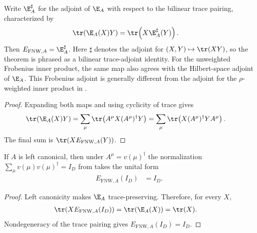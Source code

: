 \begin{lemma}
    \label{thm:fnw_transfer_map_trace_adjoint}
    \leanok
    Write $\E_A^\sharp$ for the adjoint of $\E_A$ with respect to the
    bilinear trace pairing, characterized by
    \begin{align}
        \tr\!\left(\E_A(X)Y\right)
         & =\tr\!\left(X\E_A^\sharp(Y)\right).
        \label{eq:fnw_transfer_map_trace_adjoint}
    \end{align}
    Then $E_{\mathrm{FNW},A}=\E_A^\sharp$. Here $\sharp$ denotes the adjoint
    for $(X,Y)\mapsto\tr(XY)$, so the theorem is phrased as a bilinear
    trace-adjoint identity. For the unweighted Frobenius inner product, the
    same map also agrees with the Hilbert-space adjoint of $\E_A$. This
    Frobenius adjoint is generally different from the adjoint for the
    $\rho$-weighted inner product in
    \cite[Equation~(5.6)]{Fannes1992Finitely}.
\end{lemma}

\begin{proof}
    \leanok
    Expanding both maps and using cyclicity of trace gives
    \begin{align}
        \tr\!\left(\E_A(X)Y\right)
         & =\sum_\mu\tr\!\left(A^\mu X(A^\mu)^\dagger Y\right)
        =\sum_\mu\tr\!\left(X(A^\mu)^\dagger YA^\mu\right).
    \end{align}
    The final sum is $\tr(XE_{\mathrm{FNW},A}(Y))$.
\end{proof}

\begin{lemma}
    \label{thm:fnw_transfer_map_one}
    \leanok
    If $A$ is left canonical, then under $A^\mu=v(\mu)^\dagger$ the
    normalization $\sum_\mu v(\mu)v(\mu)^\dagger=I_D$ from
    \cite[Equation~(5.3b)]{Fannes1992Finitely} takes the unital form
    \begin{align}
        E_{\mathrm{FNW},A}(I_D) & =I_D.
        \label{eq:fnw_transfer_map_one}
    \end{align}
\end{lemma}

\begin{proof}
    \leanok
    Left canonicity makes $\E_A$ trace-preserving. Therefore, for every $X$,
    \begin{align}
        \tr\!\left(XE_{\mathrm{FNW},A}(I_D)\right)
         & =\tr\!\left(\E_A(X)\right)=\tr(X).
    \end{align}
    Nondegeneracy of the trace pairing gives
    $E_{\mathrm{FNW},A}(I_D)=I_D$.
\end{proof}

